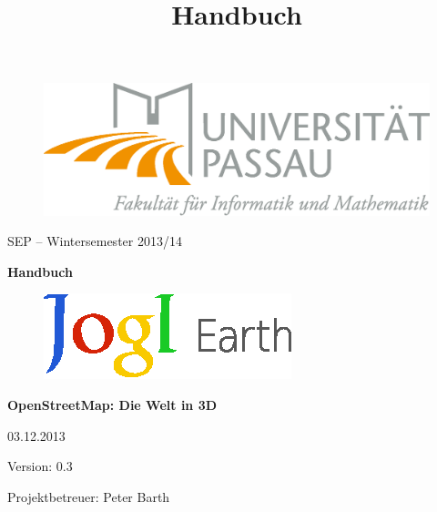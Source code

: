 \documentclass[10pt]{scrreprt}
\begin{document}
\thispagestyle{empty}
\sffamily
 
\title{Handbuch}

\begin{figure}
\begin{flushright}
	\includegraphics[scale=0.4]{uniLogo.eps}
\vspace{2.0 cm}
\end{flushright}
\end{figure}

\begin{center}
\vspace{2.0 cm}
{\LARGE SEP – Wintersemester 2013/14}

\vspace{1.0 cm}
\textbf{{\Huge Handbuch}}

\vspace{0.4 cm}
\begin{figure}[!htb]
\begin{center}
	\includegraphics[scale=1.5]{Logo-Print.eps}
\end{center}
\end{figure}

\vspace{0.2 cm}
\textbf{{\huge OpenStreetMap: Die Welt in 3D}}

\vspace{1.5 cm}
03.12.2013

\vspace{0.5 cm}
Version: 0.3

\vspace{1.5 cm}
{\Large Projektbetreuer: Peter Barth}

\end{center}


\pagebreak
\rmfamily
\tableofcontents
\end{document}
